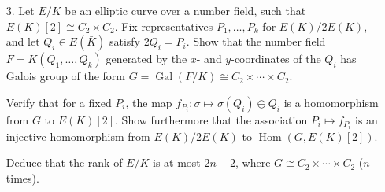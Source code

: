 \documentclass[a4paper]{article}
\theoremstyle{plain}
\theoremstyle{remark}
\theoremstyle{definition}
\DeclareMathOperator{\Hom}{Hom}
\DeclareMathOperator{\Gal}{Gal}
\begin{document}
\begin{enumerate}
\begin{proof}[Solution]
\begin{align*}
                    &\le 2^{2n+1}\cdot\max_{a\in S}\bigl(h(a)+C-h(0)\bigr)
                        + 2^{n+1}(h(x)+C),
            \end{align*}
            noting that $h(a_0)\le h(a_0)+C-h(0)$ since $|2h(0)-4h(0)|\le C$
            implies $h(0)\le\frac{C}{2}$. Hence
            \begin{align*}
                h(y)
                    &\le 4^{-n-1}h(2^{n+1}y) + h(0) + C \\
                    &\le 2^{-1}\cdot\max_{a\in S}\bigl(h(a)+C-h(0)\bigr)
                        + 2^{-n-1}(h(x)+C),
            \end{align*}
            so for $n$ large enough we have
            \begin{equation*}
                h(y) \le 2^{-1}\cdot\max_{a\in S}\bigl(h(a)+C-h(0)\bigr) + 1.
            \end{equation*}
            Now the $T\subseteq A$ of $y\in A$ satisfying this inequality is
            finite, and since $f$ is a linear combination of
            $a_0,a_1,\ldots\in S$ and $y\in T$, we see that the finite set
            $S\cup T$ generates $A$.
        \end{proof}

    \item[3.] Let $E/K$ be an elliptic curve over a number field, such that
        $E(K)[2]\cong C_2\times C_2$. Fix representatives $P_1,\ldots,P_k$ for
        $E(K)/2E(K)$, and let $Q_i\in E(\bar K)$ satisfy $2Q_i=P_i$. Show that
        the number field $F=K(Q_1,\ldots,Q_k)$ generated by the $x$- and
        $y$-coordinates of the $Q_i$ has Galois group of the form
        $G=\Gal(F/K)\cong C_2\times\cdots\times C_2$.

        Verify that for a fixed $P_i$, the map
        $f_{P_i}:\sigma\mapsto\sigma(Q_i)\ominus Q_i$ is a homomorphism from $G$
        to $E(K)[2]$. Show furthermore that the association $P_i\mapsto f_{P_i}$
        is an injective homomorphism from $E(K)/2E(K)$ to $\Hom(G,E(K)[2])$.

        Deduce that the rank of $E/K$ is at most $2n-2$, where
        $G\cong C_2\times\cdots\times C_2$ ($n$ times).


\end{enumerate}
\end{document}
